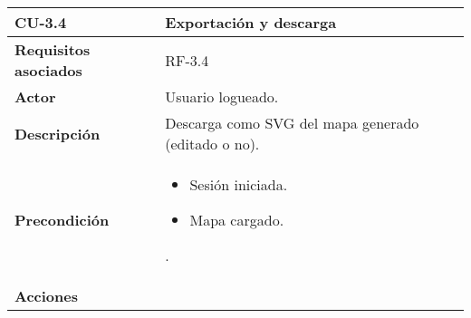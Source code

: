 \begin{longtable}[H]{@{}l|l@{}}
	\toprule
	\begin{minipage}[b]{0.23\columnwidth}\raggedright\strut
		\textbf{CU-3.4}\strut
	\end{minipage} & \begin{minipage}[b]{0.71\columnwidth}\raggedright\strut
		\textbf{Exportación y descarga}\strut
	\end{minipage}\tabularnewline
	\toprule
	\endhead
	\begin{minipage}[t]{0.23\columnwidth}\raggedright\strut
		\textbf{Requisitos asociados}\strut
	\end{minipage} & \begin{minipage}[t]{0.71\columnwidth}\raggedright\strut
		RF-3.4\strut
	\end{minipage}\tabularnewline
	\midrule
	\begin{minipage}[t]{0.23\columnwidth}\raggedright\strut
		\textbf{Actor}\strut
	\end{minipage} & \begin{minipage}[t]{0.71\columnwidth}\raggedright\strut
		Usuario logueado.\strut
	\end{minipage}\tabularnewline
	\midrule
	\begin{minipage}[t]{0.23\columnwidth}\raggedright\strut
		\textbf{Descripción}\strut
	\end{minipage} & \begin{minipage}[t]{0.71\columnwidth}\raggedright\strut
		Descarga como SVG del mapa generado (editado o no).\strut
	\end{minipage}\tabularnewline
	\midrule
	\begin{minipage}[t]{0.23\columnwidth}\raggedright\strut
		\textbf{Precondición}\strut
	\end{minipage} & \begin{minipage}[t]{0.71\columnwidth}\raggedright
		\begin{itemize}
			\item Sesión iniciada.
			\item Mapa cargado.
		\end{itemize}.
	\end{minipage}\tabularnewline
	\midrule
	\begin{minipage}[t]{0.23\columnwidth}\raggedright\strut
		\textbf{Acciones}\strut
	\end{minipage} & \begin{minipage}[t]{0.71\columnwidth}\raggedright
		\begin{enumerate}

\end{enumerate}
\end{minipage}
\end{longtable}
